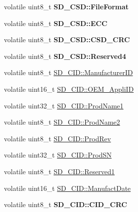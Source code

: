 \begin{DoxyCompactItemize}
\item 
volatile uint8\+\_\+t {\bfseries S\+D\+\_\+\+C\+S\+D\+::\+File\+Format}\hypertarget{group__sd__card_ga3435892f554d46b7bc17aa658031945b}{}\label{group__sd__card_ga3435892f554d46b7bc17aa658031945b}

\item 
volatile uint8\+\_\+t {\bfseries S\+D\+\_\+\+C\+S\+D\+::\+E\+CC}\hypertarget{group__sd__card_gaa348f5bef86a7a8723bb0281b8e8551d}{}\label{group__sd__card_gaa348f5bef86a7a8723bb0281b8e8551d}

\item 
volatile uint8\+\_\+t {\bfseries S\+D\+\_\+\+C\+S\+D\+::\+C\+S\+D\+\_\+\+C\+RC}\hypertarget{group__sd__card_ga43450c04007ddabe115972b6dd9d4f3e}{}\label{group__sd__card_ga43450c04007ddabe115972b6dd9d4f3e}

\item 
volatile uint8\+\_\+t {\bfseries S\+D\+\_\+\+C\+S\+D\+::\+Reserved4}\hypertarget{group__sd__card_ga25a315f2dadfbed5ad39898ce0ae25cc}{}\label{group__sd__card_ga25a315f2dadfbed5ad39898ce0ae25cc}

\item 
volatile uint8\+\_\+t \hyperlink{group__sd__card_gac16d38fcef6d661738d8f880f899a5ee}{S\+D\+\_\+\+C\+I\+D\+::\+Manufacturer\+ID}
\item 
volatile uint16\+\_\+t \hyperlink{group__sd__card_gae715248acd4c86ce3b821759bef6f1e1}{S\+D\+\_\+\+C\+I\+D\+::\+O\+E\+M\+\_\+\+Appli\+ID}
\item 
volatile uint32\+\_\+t \hyperlink{group__sd__card_gab707dc163bd2cb8fc8d98643ea797585}{S\+D\+\_\+\+C\+I\+D\+::\+Prod\+Name1}
\item 
volatile uint8\+\_\+t \hyperlink{group__sd__card_gaaa6e8c0191c67b8692c0dc8dfccff76d}{S\+D\+\_\+\+C\+I\+D\+::\+Prod\+Name2}
\item 
volatile uint8\+\_\+t \hyperlink{group__sd__card_ga3c9906d1956b15f7e333323af56fe052}{S\+D\+\_\+\+C\+I\+D\+::\+Prod\+Rev}
\item 
volatile uint32\+\_\+t \hyperlink{group__sd__card_gadc2afe7dd7073a844eaebb4bd4449abb}{S\+D\+\_\+\+C\+I\+D\+::\+Prod\+SN}
\item 
volatile uint8\+\_\+t \hyperlink{group__sd__card_ga1d5599017d56204e4fe5b0aa7dd32294}{S\+D\+\_\+\+C\+I\+D\+::\+Reserved1}
\item 
volatile uint16\+\_\+t \hyperlink{group__sd__card_ga6fa8e16f55984066e24cf2503477dfcd}{S\+D\+\_\+\+C\+I\+D\+::\+Manufact\+Date}
\item 
volatile uint8\+\_\+t {\bfseries S\+D\+\_\+\+C\+I\+D\+::\+C\+I\+D\+\_\+\+C\+RC}\hypertarget{group__sd__card_gaab5a4086870be0b9255ee6350789d970}{}\label{group__sd__card_gaab5a4086870be0b9255ee6350789d970}


\end{DoxyCompactItemize}
